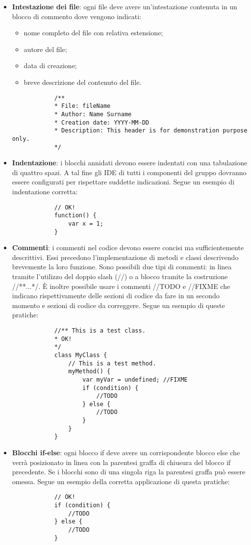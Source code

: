 \begin{itemize}
\begin{itemize}
				\end{itemize}
				\item \textbf{Intestazione dei file}: ogni file deve avere un'intestazione contenuta in un blocco di commento dove vengono indicati:
				\begin{itemize}
					\item nome completo del file con relativa estensione;
					\item autore del file;
					\item data di creazione;
					\item breve descrizione del contenuto del file.
				\end{itemize}
			\begin{lstlisting}
			/**
			* File: fileName
			* Author: Name Surname
			* Creation date: YYYY-MM-DD
			* Description: This header is for demonstration purpose only.
			*/
			\end{lstlisting}
				\item \textbf{Indentazione}: i blocchi annidati devono essere indentati con una tabulazione di quattro spazi. A tal fine gli IDE di tutti i componenti del gruppo dovranno essere configurati per rispettare suddette indicazioni. Segue un esempio di indentazione corretta:
			\begin{lstlisting}
			// OK!
			function() {
				var x = 1;
			}
			\end{lstlisting}
				\item \textbf{Commenti}: i commenti nel codice devono essere concisi ma sufficientemente descrittivi. Essi precedono l'implementazione di metodi e classi descrivendo brevemente la loro funzione. Sono possibili due tipi di commenti: in linea tramite l'utilizzo del doppio slash (//) o a blocco tramite la costruzione //**...*/.  È inoltre possibile usare i commenti //TODO e //FIXME che indicano rispettivamente delle sezioni di codice da fare in un secondo momento e sezioni di codice da correggere. Segue un esempio di queste pratiche:
			\begin{lstlisting}
			//** This is a test class.
			* OK!
			*/
			class MyClass {
				// This is a test method.
				myMethod() {
					var myVar = undefined; //FIXME
					if (condition) {
						//TODO
					} else {
						//TODO
					}
				}
			}
			\end{lstlisting}
				\item \textbf{Blocchi if-else}: ogni blocco if deve avere un corrispondente blocco else che verrà posizionato in linea con la parentesi graffa di chiusura del blocco if precedente. Se i blocchi sono di una singola riga la parentesi graffa può essere omessa. Segue un esempio della corretta applicazione di questa pratiche:
			\begin{lstlisting}
			// OK!
			if (condition) {
				//TODO
			} else {
				//TODO
			}
			

\end{lstlisting}
\end{itemize}
